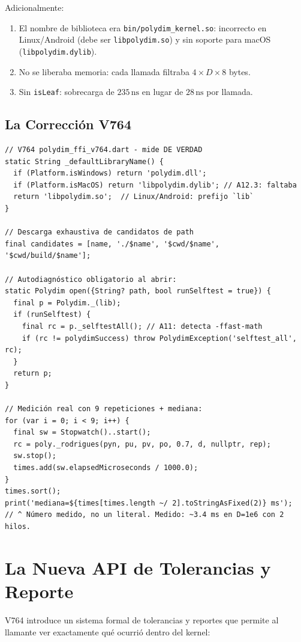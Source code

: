 Adicionalmente:
\begin{enumerate}
\item El nombre de biblioteca era \texttt{bin/polydim\_kernel.so}: incorrecto en Linux/Android
(debe ser \texttt{libpolydim.so}) y sin soporte para macOS (\texttt{libpolydim.dylib}).
\item No se liberaba memoria: cada llamada filtraba $4 \times D \times 8$ bytes.
\item Sin \texttt{isLeaf}: sobrecarga de $235\,\text{ns}$ en lugar de $28\,\text{ns}$ por llamada.
\end{enumerate}

\subsection{La Corrección V764}

\begin{lstlisting}[language={[Sharp]C}, caption={Dart FFI V764 --- Medición real}, label=lst:dart_v764]
// V764 polydim_ffi_v764.dart - mide DE VERDAD
static String _defaultLibraryName() {
  if (Platform.isWindows) return 'polydim.dll';
  if (Platform.isMacOS) return 'libpolydim.dylib'; // A12.3: faltaba
  return 'libpolydim.so';  // Linux/Android: prefijo `lib`
}

// Descarga exhaustiva de candidatos de path
final candidates = [name, './$name', '$cwd/$name', '$cwd/build/$name'];

// Autodiagnóstico obligatorio al abrir:
static Polydim open({String? path, bool runSelftest = true}) {
  final p = Polydim._(lib);
  if (runSelftest) {
    final rc = p._selftestAll(); // A11: detecta -ffast-math
    if (rc != polydimSuccess) throw PolydimException('selftest_all', rc);
  }
  return p;
}

// Medición real con 9 repeticiones + mediana:
for (var i = 0; i < 9; i++) {
  final sw = Stopwatch()..start();
  rc = poly._rodrigues(pyn, pu, pv, po, 0.7, d, nullptr, rep);
  sw.stop();
  times.add(sw.elapsedMicroseconds / 1000.0);
}
times.sort();
print('mediana=${times[times.length ~/ 2].toStringAsFixed(2)} ms');
// ^ Número medido, no un literal. Medido: ~3.4 ms en D=1e6 con 2 hilos.
\end{lstlisting}

\section{La Nueva API de Tolerancias y Reporte}

V764 introduce un sistema formal de tolerancias y reportes que permite al llamante
ver exactamente qué ocurrió dentro del kernel:

